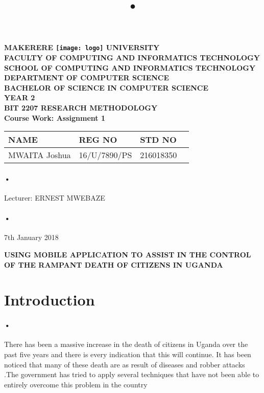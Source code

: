 \documentclass[12pt]{article}
\begin{document}
\begin{Huge}
\begin{center}
\begin{normalsize}
\textbf{MAKERERE \texttt{[image: logo]} UNIVERSITY }\\


\textbf{FACULTY OF COMPUTING AND INFORMATICS TECHNOLOGY} \\
\textbf{SCHOOL OF COMPUTING AND INFORMATICS TECHNOLOGY} \\
\textbf{DEPARTMENT OF COMPUTER SCIENCE} \\
\textbf{BACHELOR OF SCIENCE IN COMPUTER SCIENCE} \\
\textbf{YEAR 2} \\
\textbf{BIT 2207 RESEARCH METHODOLOGY} \\
\textbf{Course Work: Assignment 1}\\
\end{normalsize}
\end{center}
\end{Huge}

\begin{center}
\begin{tabular}{|l|l|l|c|}
\hline NAME  & REG NO & STD NO \\\hline
MWAITA Joshua& 16/U/7890/PS & 216018350 \\\hline

\end{tabular}
\paragraph{•}
Lecturer: ERNEST MWEBAZE \\
\paragraph{•}
7th January 2018

\end{center}

\newpage


\title{•}\textbf{USING MOBILE APPLICATION TO ASSIST IN THE CONTROL OF THE RAMPANT DEATH OF CITIZENS IN UGANDA}
\section{Introduction}

\paragraph{•}There has been a massive increase in the death of citizens in Uganda over the past five years and there is every indication that this will continue. It has been noticed that many of these death are as result   of diseases and robber attacks .The government has tried to apply several techniques that have not been able to entirely overcome this problem in the country
\end{document}
